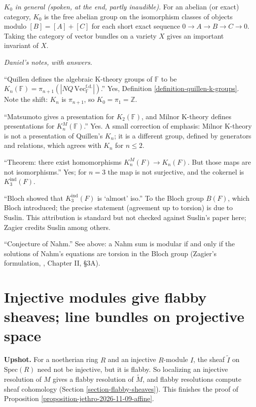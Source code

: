 \textit{$K_0$ in general (spoken, at the
end, partly inaudible).} For an abelian (or
exact) category, $K_0$ is the free abelian
group on the isomorphism classes of objects
modulo $[B]=[A]+[C]$ for each short exact
sequence $0\to A\to B\to C\to 0$. Taking the
category of vector bundles on a variety $X$
gives an important invariant of $X$.

\medskip\noindent
\textit{Daniel's notes, with answers.}

``Quillen defines the algebraic K-theory
groups of $\mathbb{F}$ to be
$K_n(\mathbb{F})=\pi_{n+1}(|NQ\,
\mathrm{Vec}^{\mathrm{f.d.}}_{\mathbb{F}}
|)$.''
Yes, Definition
\ref{definition-quillen-k-groups}.
Note the shift: $K_n$ is $\pi_{n+1}$, so
$K_0=\pi_1=\mathbb{Z}$.

``Matsumoto gives a presentation for
$K_2(\mathbb{F})$, and Milnor K-theory
defines
presentations for $K_n^M(\mathbb{F})$.'' Yes.
A small correction of emphasis: Milnor
K-theory is not a presentation of Quillen's
$K_n$; it is a different group, defined by
generators and relations, which agrees with
$K_n$ for $n\leq 2$.

``Theorem: there exist homomorphisms
$K_n^M(F)\to K_n(F)$. But those maps are not
isomorphisms.'' Yes; for $n=3$ the map is not
surjective, and the cokernel is
$K_3^{\mathrm{ind}}(F)$.

``Bloch showed that $K_3^{\mathrm{ind}}(F)$
is
`almost' iso.'' To the Bloch group $B(F)$,
which Bloch introduced; the precise statement
(agreement up to torsion) is due to Suslin.
This attribution is standard but not checked
against Suslin's paper here; Zagier
\cite{zagier-dilog} credits Suslin among
others.

``Conjecture of Nahm.'' See above: a Nahm
sum is modular if and only if the solutions
of Nahm's equations are torsion in the Bloch
group (Zagier's formulation,
\cite{zagier-dilog}, Chapter II, \S 3A).

\section{Injective modules give flabby
sheaves; line bundles on projective space}
\label{section-jethro-2026-11-11}

\noindent
{\bf Upshot.} For a noetherian ring $R$
and an injective $R$-module $I$, the sheaf
$\widetilde{I}$ on $\mathrm{Spec}(R)$ need
not be injective, but it is flabby. So
localizing an injective resolution of $M$
gives a flabby resolution of
$\widetilde{M}$, and flabby resolutions
compute sheaf cohomology (Section
\ref{section-flabby-sheaves}). This finishes
the proof of Proposition
\ref{proposition-jethro-2026-11-09-affine}.

